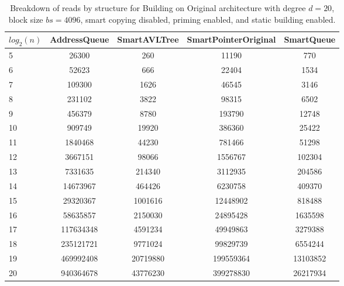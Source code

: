 \begin{table}[]
\centering
\begin{tabular}{|l|c|c|c|c|}
$log_2(n)$ & AddressQueue & SmartAVLTree & SmartPointerOriginal & SmartQueue \\ \hline
5 & 26300 & 260 & 11190 & 770 \\ \hline
6 & 52623 & 666 & 22404 & 1534 \\ \hline
7 & 109300 & 1626 & 46545 & 3146 \\ \hline
8 & 231102 & 3822 & 98315 & 6502 \\ \hline
9 & 456379 & 8780 & 193790 & 12748 \\ \hline
10 & 909749 & 19920 & 386360 & 25422 \\ \hline
11 & 1840468 & 44230 & 781466 & 51298 \\ \hline
12 & 3667151 & 98066 & 1556767 & 102304 \\ \hline
13 & 7331635 & 214340 & 3112935 & 204586 \\ \hline
14 & 14673967 & 464426 & 6230758 & 409370 \\ \hline
15 & 29320367 & 1001616 & 12448902 & 818488 \\ \hline
16 & 58635857 & 2150030 & 24895428 & 1635598 \\ \hline
17 & 117634348 & 4591234 & 49949863 & 3279388 \\ \hline
18 & 235121721 & 9771024 & 99829739 & 6554244 \\ \hline
19 & 469992408 & 20719880 & 199559364 & 13103852 \\ \hline
20 & 940364678 & 43776230 & 399278830 & 26217934 \\ \hline
\end{tabular}
\caption{Breakdown of reads by structure for Building on Original architecture with degree $d=20$, block size $bs=4096$, smart copying disabled, priming enabled, and static building enabled.}
    \label{tab:reads_by_structure_build_d20_bs4096_copiesfalse_primetrue_staticinsertiontrue_ptoriginal_movefalse}
\end{table}

